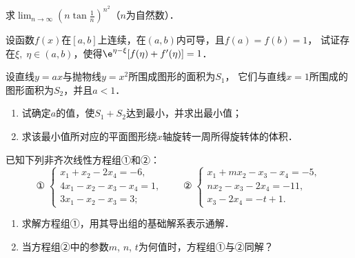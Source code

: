 \documentclass[plain,noanswer,medmath]{../../template/jnuexam}
\begin{document}



\begin{problem}
求$\lim_{n \to \infty} \left(n\tan \frac{1}{n} \right)^{n^2}$（$n$为自然数）．
\end{problem}












\begin{problem}
设函数$f(x)$在$\left[a,b \right]$上连续，在$\left(a,b \right)$内可导，且$f(a) = f(b) = 1$，
试证存在$\xi ,\;\eta \in(a,b)$，使得$\e^{\eta - \xi}[f(\eta) + f'(\eta)] = 1$．
\end{problem}



\begin{problem}
设直线$y = ax$与抛物线$y = x^2$所围成图形的面积为$S_1$，
它们与直线$x = 1$所围成的图形面积为$S_2$，并且$a < 1$．
\begin{enumerate}
\item 试确定$a$的值，使$S_1 + S_2$达到最小，并求出最小值；
\item 求该最小值所对应的平面图形绕$x$轴旋转一周所得旋转体的体积．
\end{enumerate}
\end{problem}






\begin{problem}
已知下列非齐次线性方程组①和②：
$$\text{①}\;\begin{cases}
  x_1 + x_2 - 2x_4 = - 6, \\
  4x_1 - x_2 - x_3 - x_4 = 1, \\
  3x_1 - x_2 - x_3 = 3;
\end{cases}\qquad\text{②}\;\begin{cases}
  x_1 + mx_2 - x_3 - x_4 = - 5, \\
  nx_2 - x_3 - 2x_4 = - 11, \\
  x_3 - 2x_4 = - t + 1.
\end{cases}$$
\begin{enumerate}
\item 求解方程组①，用其导出组的基础解系表示通解．
\item 当方程组②中的参数$m$, $n$, $t$为何值时，方程组①与②同解？
\end{enumerate}
\end{problem}
\end{document}
